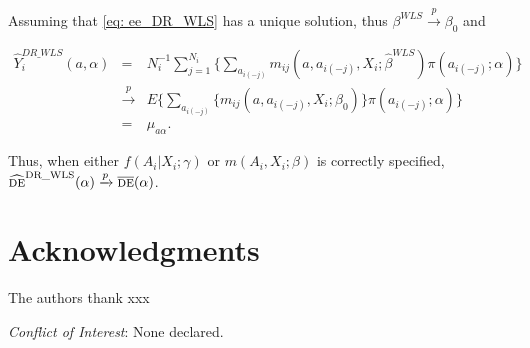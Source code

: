 \documentclass[oupdraft]{biostatistics}
\begin{document}
\noindent Assuming that \eqref{eq: ee_DR_WLS} has a unique solution, thus $\beta^{WLS}\xrightarrow{p}\beta_0$ and 

\begin{eqnarray*}
 \widehat{Y}_i^{DR\_WLS}(a,\alpha)&=&N_i^{-1}\sum_{j=1}^{N_i}\Biggl\{\sum_{a_{i(-j)}}m_{ij}(a,a_{i(-j)},X_i;\hat\beta^{WLS})\pi(a_{i(-j)};\alpha)
 \Biggr\}\\
 &\xrightarrow{p}&E\Biggl\{\sum_{a_{i(-j)}}\{m_{ij}(a,a_{i(-j)},X_i;\beta_0)\}
  \pi(a_{i(-j)};\alpha)\biggr\}\\
  &=&\mu_{a\alpha}.
\end{eqnarray*}

Thus, when either $f(A_i|X_i;\gamma)$ or $m(A_i,X_i;\beta)$ is correctly specified, $\widehat{\textsc{de}}^{\text{DR\_WLS}}(\alpha)\xrightarrow{p}\overline{\textsc{de}}(\alpha)$.


\section*{Acknowledgments}

The authors thank xxx

{\it Conflict of Interest}: None declared.




%


\end{document}
